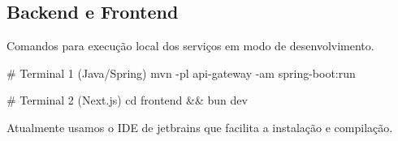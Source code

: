 \subsection{Backend e Frontend}
Comandos para execução local dos serviços em modo de desenvolvimento.
\begin{codeblock}
# Terminal 1 (Java/Spring)
mvn -pl api-gateway -am spring-boot:run

# Terminal 2 (Next.js)
cd frontend && bun dev
\end{codeblock}

Atualmente usamos o IDE de jetbrains que facilita a instalação e compilação.